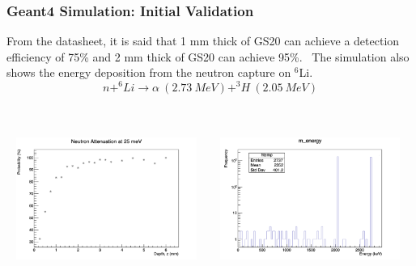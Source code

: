 \documentclass[xcolor=x11names, compress, handout]{beamer}
\renewcommand{\(}{\begin{columns}}
\renewcommand{\)}{\end{columns}}
\newcommand{\<}[1]{\begin{column}{#1}}
\renewcommand{\>}{\end{column}}
\begin{document}
\begin{frame}
  \frametitle{Geant4 Simulation: Initial Validation}
  From the datasheet, it is said that 1 mm thick of GS20 can achieve a detection efficiency of 75\% and 2 mm thick of GS20 can achieve 95\%.
  \
  The simulation also shows the energy deposition from the neutron capture on $^6$Li.
  $$ n + ^6Li \rightarrow \alpha ~(2.73 ~MeV) + ^3H ~(2.05~MeV) $$
  \ \\
  \

  \centering
  \includegraphics[width=0.49\textwidth,height=4cm]{images/gs20_attenuation_simulated.png}
  \includegraphics[width=0.49\textwidth,height=4cm]{images/energy_deposition.png}
\end{frame}
\end{document}

